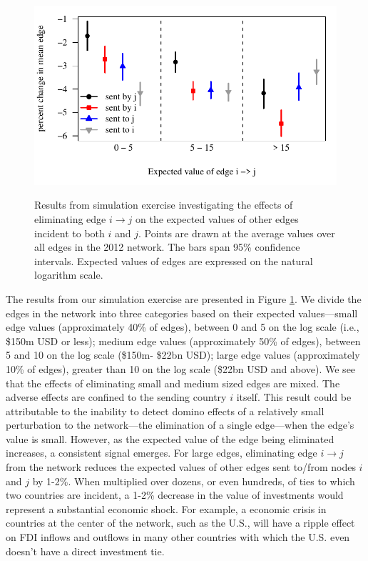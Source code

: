 \documentclass[reqno,onecolumn,letterpaper,12pt]{article}
\begin{document}
\begin{figure}[!h]
\centering
\includegraphics[scale=.85]{./figures/contagion_simulation_results} \vspace{-.5cm}\\
\caption{\label{fig:contagion} Results from simulation exercise investigating the effects of eliminating edge $i \rightarrow j$ on the expected values of other edges incident to both $i$ and $j$. Points are drawn at the average values over all edges in the 2012 network. The bars span 95\% confidence intervals.  Expected values of edges are expressed on the natural logarithm scale.}
\end{figure}

The results from our simulation exercise are presented in Figure \ref{fig:contagion}. We divide the edges in the network into three categories based on their expected values---small edge values (approximately 40\% of edges), between 0 and 5 on the log scale (i.e., \$150m USD or less); medium edge values (approximately 50\% of edges), between 5 and 10 on the log scale (\$150m- \$22bn USD); large edge values (approximately 10\% of edges), greater than 10 on the log scale (\$22bn USD and above). We see that the effects of eliminating small and medium sized edges are mixed. The adverse effects are confined to the sending country $i$ itself. This result could be attributable to the inability to detect domino effects of a relatively small perturbation to the network---the elimination of a single edge---when the edge's value is small. However, as the expected value of the edge being eliminated increases, a consistent signal emerges. For large edges, eliminating edge $i \rightarrow j$ from the network reduces the expected values of other edges sent to/from nodes $i$ and $j$ by 1-2\%. When multiplied over dozens, or even hundreds, of ties to which two countries are incident, a 1-2\% decrease in the value of investments would represent a substantial economic shock. For example, a economic crisis in countries at the center of the network, such as the U.S., will have a ripple effect on FDI inflows and outflows in many other countries with which the U.S. even doesn't have a direct investment tie.
\end{document}
